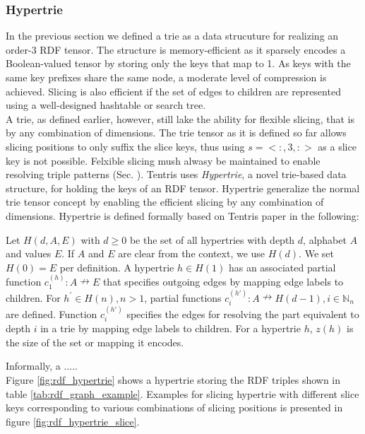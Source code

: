 \subsubsection{Hypertrie}
In the previous section we defined a trie as a data strucuture for realizing an order-3 RDF tensor. The structure is memory-efficient as it sparsely encodes a Boolean-valued tensor by storing only the keys that map to 1. As keys with the same key prefixes share the same node, a moderate level of compression is achieved. Slicing is also efficient if the set of edges to children are represented using a well-designed hashtable or search tree\cite{bras}. \\

A trie, as defined earlier, however, still lake the ability for flexible slicing, that is by any combination of dimensions. The trie tensor as it is defined so far allows slicing positions to only suffix the slice keys, thus using $s = <:, 3, :>$ as a slice key is not possible. Felxible slicing mush alwasy be maintained to enable resolving triple patterns (Sec. ). Tentris uses \textit{Hypertrie}, a novel trie-based data structure, for holding the keys of an RDF tensor. Hypertrie generalize the normal trie tensor concept by enabling the efficient slicing by any combination of dimensions. Hypertrie is defined formally based on Tentris paper \cite{tentris2020} in the following:\\

\begin{definition}
	\label{def:bht}
	Let $H(d, A, E)$ with $d \geq 0$ be the set of all hypertries with depth $d$, alphabet $A$ and values $E$.
	If $A$ and $E$ are clear from the context, we use $H(d)$.
	We set $H(0) = E$ per definition. 
	A hypertrie $h\in H(1)$ has an associated partial function $c^{(h)}_1: A\nrightarrow E$ that specifies outgoing edges by mapping edge labels to children.
	For $ h^{'} \in H(n), n>1 $, partial functions $c^{(h')}_i: A \nrightarrow H(d-1), i \in \mathbb{N}_{n}$ are defined.
	Function $c^{(h')}_i$ specifies the edges for resolving the part equivalent to depth $i$ in a trie by mapping edge labels to children.
	For a hypertrie $h$, $z(h)$ is the size of the set or mapping it encodes.
\end{definition}

 Informally, a ..... \\

Figure \ref{fig:rdf_hypertrie} shows a hypertrie storing the RDF triples shown in table \ref{tab:rdf_graph_example}. Examples for slicing hypertrie with different slice keys corresponding to various combinations of slicing positions is presented in figure \ref{fig:rdf_hypertrie_slice}. \\

